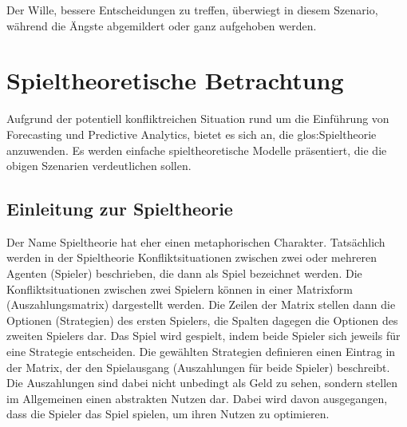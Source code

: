 {%

Der Wille, bessere Entscheidungen zu treffen, überwiegt in diesem Szenario, während
die Ängste abgemildert oder ganz aufgehoben werden.

\section{Spieltheoretische Betrachtung}


Aufgrund der potentiell konfliktreichen Situation rund um die Einführung von
Forecasting und Predictive Analytics, bietet es sich an, die
\gls{glos:Spieltheorie} anzuwenden. Es werden einfache spieltheoretische Modelle
präsentiert, die die obigen Szenarien verdeutlichen sollen.

\subsection{Einleitung zur Spieltheorie}

Der Name Spieltheorie hat eher einen metaphorischen Charakter. Tatsächlich
werden in der Spieltheorie Konfliktsituationen zwischen zwei oder mehreren Agenten (Spieler) beschrieben,
die dann als Spiel bezeichnet werden. Die Konfliktsituationen zwischen zwei Spielern können in einer Matrixform (Auszahlungsmatrix)
dargestellt werden. Die Zeilen der Matrix stellen dann die Optionen (Strategien) des ersten Spielers, die Spalten dagegen die
Optionen des zweiten Spielers dar. Das Spiel wird gespielt, indem beide Spieler sich jeweils für eine Strategie entscheiden. 
Die gewählten Strategien definieren einen Eintrag in der Matrix, der den Spielausgang (Auszahlungen für beide Spieler) beschreibt.
Die Auszahlungen sind dabei nicht unbedingt als Geld zu sehen, sondern stellen im Allgemeinen einen abstrakten Nutzen dar. Dabei
wird davon ausgegangen, dass die Spieler das Spiel spielen, um ihren Nutzen zu optimieren.

}
